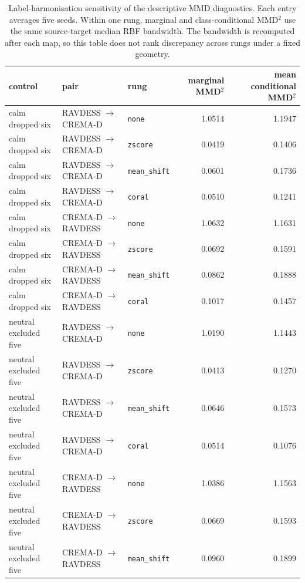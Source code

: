 \begin{table}[!t]
  \centering
  \caption{Label-harmonisation sensitivity of the descriptive MMD diagnostics. Each entry averages five seeds. Within one rung, marginal and class-conditional MMD$^2$ use the same source-target median RBF bandwidth. The bandwidth is recomputed after each map, so this table does not rank discrepancy across rungs under a fixed geometry.}
  \label{tab:label-harmonisation-diagnostics}
  \begin{tabular}{lllrr}
    \toprule
    control & pair & rung & marginal MMD$^2$ & mean conditional MMD$^2$ \\
    \midrule
    calm dropped six & RAVDESS $\rightarrow$ CREMA-D & \texttt{none} & 1.0514 & 1.1947 \\
    calm dropped six & RAVDESS $\rightarrow$ CREMA-D & \texttt{zscore} & 0.0419 & 0.1406 \\
    calm dropped six & RAVDESS $\rightarrow$ CREMA-D & \texttt{mean\_shift} & 0.0601 & 0.1736 \\
    calm dropped six & RAVDESS $\rightarrow$ CREMA-D & \texttt{coral} & 0.0510 & 0.1241 \\
    calm dropped six & CREMA-D $\rightarrow$ RAVDESS & \texttt{none} & 1.0632 & 1.1631 \\
    calm dropped six & CREMA-D $\rightarrow$ RAVDESS & \texttt{zscore} & 0.0692 & 0.1591 \\
    calm dropped six & CREMA-D $\rightarrow$ RAVDESS & \texttt{mean\_shift} & 0.0862 & 0.1888 \\
    calm dropped six & CREMA-D $\rightarrow$ RAVDESS & \texttt{coral} & 0.1017 & 0.1457 \\
    neutral excluded five & RAVDESS $\rightarrow$ CREMA-D & \texttt{none} & 1.0190 & 1.1443 \\
    neutral excluded five & RAVDESS $\rightarrow$ CREMA-D & \texttt{zscore} & 0.0413 & 0.1270 \\
    neutral excluded five & RAVDESS $\rightarrow$ CREMA-D & \texttt{mean\_shift} & 0.0646 & 0.1573 \\
    neutral excluded five & RAVDESS $\rightarrow$ CREMA-D & \texttt{coral} & 0.0514 & 0.1076 \\
    neutral excluded five & CREMA-D $\rightarrow$ RAVDESS & \texttt{none} & 1.0386 & 1.1563 \\
    neutral excluded five & CREMA-D $\rightarrow$ RAVDESS & \texttt{zscore} & 0.0669 & 0.1593 \\
    neutral excluded five & CREMA-D $\rightarrow$ RAVDESS & \texttt{mean\_shift} & 0.0960 & 0.1899 \\

\end{tabular}
\end{table}
